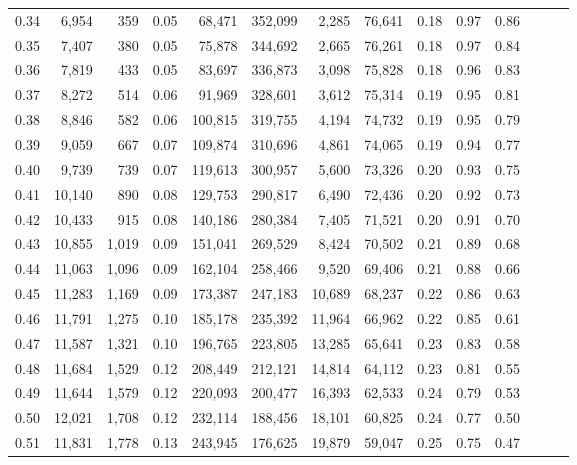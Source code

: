 \begin{tabular}{rrrrrrrrrrrrrr}
0.34 &   6,954 &    359 &  0.05 &   68,471 &  352,099 &   2,285 &  76,641 &  0.18 &  0.97 &      0.86 \\
0.35 &   7,407 &    380 &  0.05 &   75,878 &  344,692 &   2,665 &  76,261 &  0.18 &  0.97 &      0.84 \\
0.36 &   7,819 &    433 &  0.05 &   83,697 &  336,873 &   3,098 &  75,828 &  0.18 &  0.96 &      0.83 \\
0.37 &   8,272 &    514 &  0.06 &   91,969 &  328,601 &   3,612 &  75,314 &  0.19 &  0.95 &      0.81 \\
0.38 &   8,846 &    582 &  0.06 &  100,815 &  319,755 &   4,194 &  74,732 &  0.19 &  0.95 &      0.79 \\
0.39 &   9,059 &    667 &  0.07 &  109,874 &  310,696 &   4,861 &  74,065 &  0.19 &  0.94 &      0.77 \\
0.40 &   9,739 &    739 &  0.07 &  119,613 &  300,957 &   5,600 &  73,326 &  0.20 &  0.93 &      0.75 \\
0.41 &  10,140 &    890 &  0.08 &  129,753 &  290,817 &   6,490 &  72,436 &  0.20 &  0.92 &      0.73 \\
0.42 &  10,433 &    915 &  0.08 &  140,186 &  280,384 &   7,405 &  71,521 &  0.20 &  0.91 &      0.70 \\
0.43 &  10,855 &  1,019 &  0.09 &  151,041 &  269,529 &   8,424 &  70,502 &  0.21 &  0.89 &      0.68 \\
0.44 &  11,063 &  1,096 &  0.09 &  162,104 &  258,466 &   9,520 &  69,406 &  0.21 &  0.88 &      0.66 \\
0.45 &  11,283 &  1,169 &  0.09 &  173,387 &  247,183 &  10,689 &  68,237 &  0.22 &  0.86 &      0.63 \\
0.46 &  11,791 &  1,275 &  0.10 &  185,178 &  235,392 &  11,964 &  66,962 &  0.22 &  0.85 &      0.61 \\
0.47 &  11,587 &  1,321 &  0.10 &  196,765 &  223,805 &  13,285 &  65,641 &  0.23 &  0.83 &      0.58 \\
0.48 &  11,684 &  1,529 &  0.12 &  208,449 &  212,121 &  14,814 &  64,112 &  0.23 &  0.81 &      0.55 \\
0.49 &  11,644 &  1,579 &  0.12 &  220,093 &  200,477 &  16,393 &  62,533 &  0.24 &  0.79 &      0.53 \\
0.50 &  12,021 &  1,708 &  0.12 &  232,114 &  188,456 &  18,101 &  60,825 &  0.24 &  0.77 &      0.50 \\
0.51 &  11,831 &  1,778 &  0.13 &  243,945 &  176,625 &  19,879 &  59,047 &  0.25 &  0.75 &      0.47 \\

\end{tabular}
